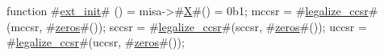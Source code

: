 function #\hyperref[sailRISCVzextzyinit]{ext\_init}# () = {
  misa->#\hyperref[sailRISCVzX]{X}#() = 0b1;
  mccsr = #\hyperref[sailRISCVzlegalizzezyccsr]{legalize\_ccsr}#(mccsr, #\hyperref[sailRISCVzzzeros]{zeros}#());
  sccsr = #\hyperref[sailRISCVzlegalizzezyccsr]{legalize\_ccsr}#(sccsr, #\hyperref[sailRISCVzzzeros]{zeros}#());
  uccsr = #\hyperref[sailRISCVzlegalizzezyccsr]{legalize\_ccsr}#(uccsr, #\hyperref[sailRISCVzzzeros]{zeros}#());
}
